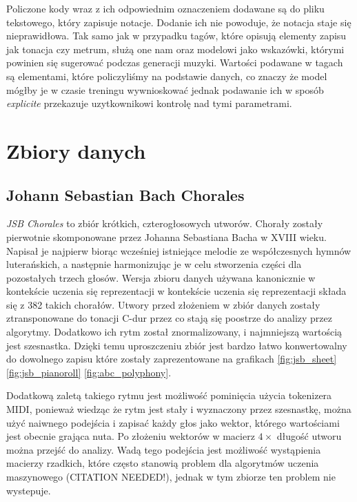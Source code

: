 \documentclass[data-science]{agh-wi} %
\begin{document}
Policzone kody wraz z ich odpowiednim oznaczeniem dodawane są do pliku tekstowego, który zapisuje notacje. Dodanie ich nie powoduje, że notacja staje się nieprawidłowa. Tak samo jak w przypadku tagów, które opisują elementy zapisu jak tonacja czy metrum, służą one nam oraz modelowi jako wskazówki, którymi powinien się sugerować podczas generacji muzyki. Wartości podawane w tagach są elementami, które policzyliśmy na podstawie danych, co znaczy że model mógłby je w czasie treningu wywnioskować jednak podawanie ich w sposób \textit{explicite} przekazuje uzytkownikowi kontrolę nad tymi parametrami.

\section{Zbiory danych}

\subsection{Johann Sebastian Bach Chorales}
\textit{JSB Chorales} \cite{bachchorales} to zbiór krótkich, czterogłosowych utworów. Chorały zostały pierwotnie skomponowane przez Johanna Sebastiana Bacha w XVIII wieku. Napisał je najpierw biorąc wcześniej istniejące melodie ze współczesnych hymnów luterańskich, a następnie harmonizując je w celu stworzenia części dla pozostałych trzech głosów. Wersja zbioru danych używana kanonicznie w kontekście uczenia się reprezentacji w kontekście uczenia się reprezentacji składa się z 382 takich chorałów. Utwory przed złożeniem w zbiór danych zostały ztransponowane do tonacji C-dur przez co stają się poostrze do analizy przez algorytmy. Dodatkowo ich rytm został znormalizowany, i najmniejszą wartością jest szesnastka. Dzięki temu uproszczeniu zbiór jest bardzo łatwo konwertowalny do dowolnego zapisu które zostały zaprezentowane na grafikach \ref*{fig:jsb_sheet} \ref*{fig:jsb_pianoroll} \ref*{fig:abc_polyphony}.

Dodatkową zaletą takiego rytmu jest możliwość pominięcia użycia tokenizera MIDI, ponieważ wiedząc że rytm jest stały i wyznaczony przez szesnastkę, można użyć naiwnego podejścia i zapisać każdy głos jako wektor, którego wartościami jest obecnie grająca nuta. Po złożeniu wektorów w macierz $4\times$ długość utworu można przejść do analizy. Wadą tego podejścia jest możliwość wystąpienia macierzy rzadkich, które często stanowią problem dla algorytmów uczenia maszynowego (CITATION NEEDED!), jednak w tym zbiorze ten problem nie wystepuje.
\end{document}

